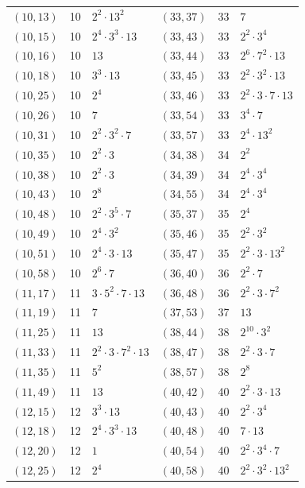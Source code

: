 \documentclass[11pt]{article}
\begin{document}
\begin{longtable}{@{}lrl@{\qquad}lrl@{}}
$(10,13)$ & 10 & $2^{2}\cdot 13^{2}$ & $(33,37)$ & 33 & $7$\\
$(10,15)$ & 10 & $2^{4}\cdot 3^{3}\cdot 13$ & $(33,43)$ & 33 & $2^{2}\cdot 3^{4}$\\
$(10,16)$ & 10 & $13$ & $(33,44)$ & 33 & $2^{6}\cdot 7^{2}\cdot 13$\\
$(10,18)$ & 10 & $3^{3}\cdot 13$ & $(33,45)$ & 33 & $2^{2}\cdot 3^{2}\cdot 13$\\
$(10,25)$ & 10 & $2^{4}$ & $(33,46)$ & 33 & $2^{2}\cdot 3\cdot 7\cdot 13$\\
$(10,26)$ & 10 & $7$ & $(33,54)$ & 33 & $3^{4}\cdot 7$\\
$(10,31)$ & 10 & $2^{2}\cdot 3^{2}\cdot 7$ & $(33,57)$ & 33 & $2^{4}\cdot 13^{2}$\\
$(10,35)$ & 10 & $2^{2}\cdot 3$ & $(34,38)$ & 34 & $2^{2}$\\
$(10,38)$ & 10 & $2^{2}\cdot 3$ & $(34,39)$ & 34 & $2^{4}\cdot 3^{4}$\\
$(10,43)$ & 10 & $2^{8}$ & $(34,55)$ & 34 & $2^{4}\cdot 3^{4}$\\
$(10,48)$ & 10 & $2^{2}\cdot 3^{5}\cdot 7$ & $(35,37)$ & 35 & $2^{4}$\\
$(10,49)$ & 10 & $2^{4}\cdot 3^{2}$ & $(35,46)$ & 35 & $2^{2}\cdot 3^{2}$\\
$(10,51)$ & 10 & $2^{4}\cdot 3\cdot 13$ & $(35,47)$ & 35 & $2^{2}\cdot 3\cdot 13^{2}$\\
$(10,58)$ & 10 & $2^{6}\cdot 7$ & $(36,40)$ & 36 & $2^{2}\cdot 7$\\
$(11,17)$ & 11 & $3\cdot 5^{2}\cdot 7\cdot 13$ & $(36,48)$ & 36 & $2^{2}\cdot 3\cdot 7^{2}$\\
$(11,19)$ & 11 & $7$ & $(37,53)$ & 37 & $13$\\
$(11,25)$ & 11 & $13$ & $(38,44)$ & 38 & $2^{10}\cdot 3^{2}$\\
$(11,33)$ & 11 & $2^{2}\cdot 3\cdot 7^{2}\cdot 13$ & $(38,47)$ & 38 & $2^{2}\cdot 3\cdot 7$\\
$(11,35)$ & 11 & $5^{2}$ & $(38,57)$ & 38 & $2^{8}$\\
$(11,49)$ & 11 & $13$ & $(40,42)$ & 40 & $2^{2}\cdot 3\cdot 13$\\
$(12,15)$ & 12 & $3^{3}\cdot 13$ & $(40,43)$ & 40 & $2^{2}\cdot 3^{4}$\\
$(12,18)$ & 12 & $2^{4}\cdot 3^{3}\cdot 13$ & $(40,48)$ & 40 & $7\cdot 13$\\
$(12,20)$ & 12 & $1$ & $(40,54)$ & 40 & $2^{2}\cdot 3^{4}\cdot 7$\\
$(12,25)$ & 12 & $2^{4}$ & $(40,58)$ & 40 & $2^{2}\cdot 3^{2}\cdot 13^{2}$\\

\end{longtable}
\end{document}
